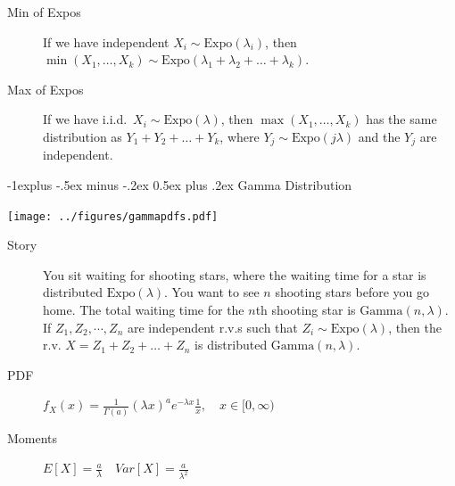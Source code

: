 \documentclass[10pt,landscape]{article}
\makeatletter
\newcommand{\Gam}{\textrm{Gamma}}
\newcommand{\Expo}{\textrm{Expo}}
\renewcommand{\subsection}{\@startsection{subsection}{2}{0mm}%
                                {-1explus -.5ex minus -.2ex}%
                                {0.5ex plus .2ex}%
                                {\normalfont\normalsize\bfseries}}
\makeatother
\begin{document}
\begin{multicols*}{3}
\begin{description}
                                                
        \item[Min of Expos] If we have independent $X_i \sim \Expo(\lambda_i)$, then $\min(X_1, \dots, X_k) \sim \Expo(\lambda_1 + \lambda_2 + \dots + \lambda_k)$. 
        \item[Max of Expos] If we have i.i.d.~$X_i \sim \Expo(\lambda)$, then $\max(X_1, \dots, X_k)$ has the same distribution as $Y_1+Y_2+\dots+Y_k$, where $Y_j \sim \Expo(j\lambda)$ and the $Y_j$ are independent.     
    \end{description}
                                    
    \subsection{Gamma Distribution}
    \begin{minipage}{\linewidth}
        \centering
        \texttt{[image: ../figures/gammapdfs.pdf]}
    \end{minipage}
    \begin{description}
        \item[Story] You sit waiting for shooting stars, where the waiting time for a star is distributed $\Expo(\lambda)$. You want to see $n$ shooting stars before you go home. The total waiting time for the $n$th shooting star is $\Gam(n,\lambda)$. If $Z_1,Z_2,\cdots,Z_n$ are independent r.v.s such that $Z_i \sim \Expo(\lambda)$, then the r.v. $X = Z_1 + Z_2 + \dots + Z_n$ is distributed $\Gam(n, \lambda)$.
        \item[PDF] $f_X(x) = \frac{1}{\Gamma(a)}(\lambda x)^ae^{-\lambda x}\frac{1}{x}, \quad x \in [0, \infty)$
              \item[Moments] $E[X] = \frac{a}{\lambda} \quad Var[X] = \frac{a}{\lambda^2}$
                                                              

\end{description}
\end{multicols*}
\end{document}
